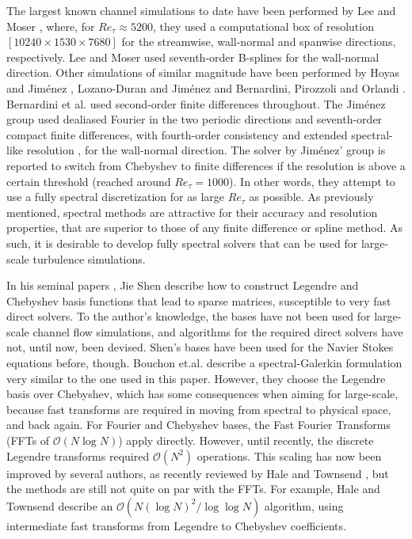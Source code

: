 \documentclass[preprint]{elsarticle}
\begin{document}
The largest known channel simulations to date have been performed by Lee and Moser \cite{leemoser15}, where, for $Re_{\tau}\approx 5200$, they used a computational box of resolution $[10240 \times 1530 \times 7680]$ for the streamwise, wall-normal and spanwise directions, respectively. Lee and Moser used seventh-order B-splines for the wall-normal direction. Other simulations of similar magnitude have been performed by Hoyas and Jim\'{e}nez \cite{hoyas06, hoyas08}, Lozano-Duran and Jim\'{e}nez \cite{Lozano2014} and Bernardini, Pirozzoli and Orlandi \cite{bernardini2014}. Bernardini et al. used second-order finite differences throughout. The Jim\'{e}nez group used dealiased Fourier in the two periodic directions and seventh-order compact finite differences, with fourth-order consistency and extended spectral-like resolution \cite{Lele92}, for the wall-normal direction. The solver by Jim\'{e}nez' group is reported to switch from Chebyshev to finite differences if the resolution is above a certain threshold \cite{hoyas08} (reached around $Re_{\tau}=1000$). In other words, they attempt to use a fully spectral discretization for as large $Re_{\tau}$ as possible. As previously mentioned, spectral methods are attractive for their accuracy and resolution properties, that are superior to those of any finite difference or spline method. As such, it is desirable to develop fully spectral solvers that can be used for large-scale turbulence simulations.

In his seminal papers \cite{Shen94,Shen95}, Jie Shen describe how to construct Legendre and Chebyshev basis functions that lead to sparse matrices, susceptible to very fast direct solvers. To the author's knowledge, the bases have not been used for large-scale channel flow simulations, and algorithms for the required direct solvers have not, until now, been devised. Shen's bases have been used for the Navier Stokes equations before, though. Bouchon et.al.  \cite{Bouchon01} describe a spectral-Galerkin formulation very similar to the one used in this paper. However, they choose the Legendre basis over Chebyshev, which has some consequences when aiming for large-scale, because fast transforms are required in moving from spectral to physical space, and back again. For Fourier and Chebyshev bases, the Fast Fourier Transforms (FFTs of $\mathcal{O} (N \log N)$) apply directly. However, until recently, the discrete Legendre transforms required $\mathcal{O}(N^2)$ operations. This scaling has now been improved by several authors, as recently reviewed by Hale and Townsend \cite{Hale14, Hale2015}, but the methods are still not quite on par with the FFTs. For example, Hale and Townsend describe an $\mathcal{O}(N (\log N)^2 / \log \log N)$ algorithm, using intermediate fast transforms from Legendre to Chebyshev coefficients.
\end{document}
